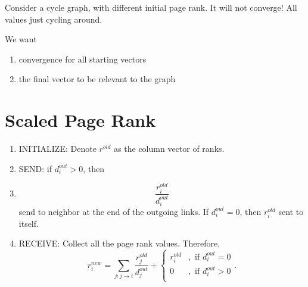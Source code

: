 \begin{eg}
	Consider a cycle graph, with different initial page rank. It will not converge! All values just cycling around.
\end{eg}

We want
\begin{enumerate}
	\item convergence for all starting vectors
	\item the final vector to be relevant to the graph
\end{enumerate}

\section{Scaled Page Rank}
\begin{enumerate}
	\item INITIALIZE: Denote \(r^{old}\) as the column vector of ranks.
	\item SEND: if \(d^{out}_i > 0\), then
	\item \[
		      \frac{r_{i}^{old}}{d_{i}^{out}}
	      \]send to neighbor at the end of the outgoing links. If \(d_{i}^{out} = 0\), then \(r_{i}^{old}\) sent to itself.
	\item RECEIVE: Collect all the page rank values. Therefore,
	      \[
		      r_{i}^{new} = \sum\limits_{j:j\to i}\frac{r_{j}^{old}}{d_{j}^{out}}+\begin{cases}
			      r_{i}^{old} & , \text{ if }d_{i}^{out} = 0 \\
			      0           & , \text{ if }d_{i}^{out} > 0 \\
		      \end{cases} .
	      \]
\end{enumerate}

